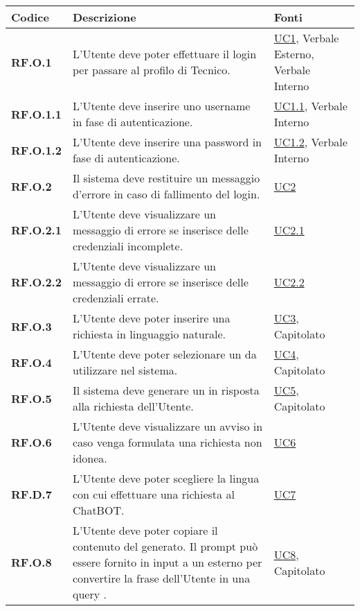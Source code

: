 \begin{longtable}{|P{3cm}|P{6,5cm}|>{\arraybackslash}P{4cm}|}
    \hline
    \textbf{Codice} & \textbf{Descrizione} & \textbf{Fonti} \\
    \hline
    \textbf{RF.O.1} & L'Utente deve poter effettuare il login per passare al profilo di Tecnico. & \hyperref[UC1]{UC1}, Verbale Esterno, Verbale Interno\\
    \hline
    \textbf{RF.O.1.1} & L'Utente deve inserire uno username in fase di autenticazione. & \hyperref[UC1point1]{UC1.1}, Verbale Interno\\
    \hline
    \textbf{RF.O.1.2} & L'Utente deve inserire una password in fase di autenticazione. & \hyperref[UC1point2]{UC1.2}, Verbale Interno\\
    \hline
    \textbf{RF.O.2} & Il sistema deve restituire un messaggio d'errore in caso di fallimento del login. & \hyperref[UC2]{UC2}\\
    \hline
    \textbf{RF.O.2.1} & L'Utente deve visualizzare un messaggio di errore se inserisce delle credenziali incomplete. & \hyperref[UC2point1]{UC2.1}\\
    \hline
    \textbf{RF.O.2.2} & L'Utente deve visualizzare un messaggio di errore se inserisce delle credenziali errate. & \hyperref[UC2point2]{UC2.2}\\
    \hline
    \textbf{RF.O.3} & L'Utente deve poter inserire una richiesta in linguaggio naturale. & \hyperref[UC3]{UC3}, Capitolato\\
    \hline
    \textbf{RF.O.4} & L'Utente deve poter selezionare un  da utilizzare nel sistema. & \hyperref[UC4]{UC4}, Capitolato\\
    \hline
    \textbf{RF.O.5} & Il sistema deve generare un  in risposta alla richiesta dell'Utente. & \hyperref[UC5]{UC5}, Capitolato\\
    \hline
    \textbf{RF.O.6} & L'Utente deve visualizzare un avviso in caso venga formulata una richiesta non idonea. & \hyperref[UC6]{UC6}\\
    \hline
    \textbf{RF.D.7} & L'Utente deve poter scegliere la lingua con cui effettuare una richiesta al ChatBOT. & \hyperref[UC7]{UC7}\\
    \hline
    \textbf{RF.O.8} & L'Utente deve poter copiare il contenuto del  generato. Il prompt può essere fornito in input a un  esterno per convertire la frase dell'Utente in una query . & \hyperref[UC8]{UC8}, Capitolato\\

\end{longtable}
